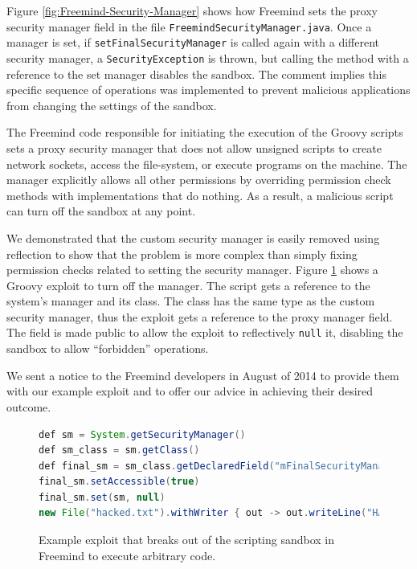 \documentclass{sig-alternate}
\begin{document}
Figure \ref{fig:Freemind-Security-Manager} shows how Freemind sets
the proxy security manager field in the file \texttt{FreemindSecurityManager.java}.
Once a manager is set, if \texttt{setFinalSecurityManager} is called
again with a different security manager, a \texttt{SecurityException}
is thrown, but calling the method with a reference to the set manager disables the sandbox. The comment implies this specific sequence
of operations was implemented to prevent malicious applications from
changing the settings of the sandbox.

The Freemind code responsible for initiating the execution of the
Groovy scripts sets a proxy security manager that does not allow unsigned
scripts to create network sockets, access the file-system, or execute
programs on the machine. The manager explicitly allows all other permissions by overriding permission check methods with implementations that do nothing. As a result, a malicious script can turn off the sandbox at any point.

We demonstrated that the custom security manager is easily removed
using reflection to show that the problem is more complex than simply
fixing permission checks related to setting the security manager. Figure \ref{fig:Example-Exploit-for-Freemind}
shows a Groovy exploit to turn off the manager. The script gets a reference to the system's manager
and its class. The class has the same type as the custom security
manager, thus the exploit gets a reference to the proxy manager field.
The field is made public to allow the exploit to reflectively \texttt{null}
it, disabling the sandbox to allow ``forbidden'' operations.

We sent a notice to the Freemind developers in August of 2014 to provide
them with our example exploit and to offer our advice in achieving
their desired outcome. 

\begin{figure}
\begin{lstlisting}[language=Java,basicstyle={\scriptsize},breaklines=true]
def sm = System.getSecurityManager() 
def sm_class = sm.getClass() 
def final_sm = sm_class.getDeclaredField("mFinalSecurityManager")
final_sm.setAccessible(true) 
final_sm.set(sm, null)
new File("hacked.txt").withWriter { out -> out.writeLine("HACKED!") }
\end{lstlisting}


\caption{Example exploit that breaks out of the scripting sandbox in Freemind
to execute arbitrary code.}
\label{fig:Example-Exploit-for-Freemind}
\end{figure}
\end{document}
